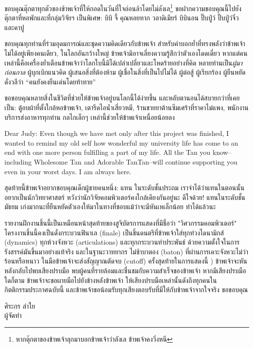 ขอบคุณตุ๊กตาทุกตัวของข้าพเจ้าที่ให้กอดในวันที่ใจอ่อนล้าโดยไม่ลังเล\footnote{หากตุ๊กตาของข้าพเจ้าลุกมาบอกข้าพเจ้าว่าลังเล ข้าพเจ้าคงวิ่งหนี} ขอฝากความขอบคุณนี้ไปยังตุ๊กตาที่หอพักและที่กลุ่มวิจัยฯ เป็นพิเศษ: บิบิ จี้ คุณหอยทาก วลาดิเมียร์ บิบินอน ปิ๊บปู่ว์ ปิ๊บปู่ว์จิ๋ว และคาปู

ขอบคุณทุกท่านที่ร่วมอุดมการณ์และชุดความคิดเดียวกับข้าพเจ้า สำหรับคำบอกย้ำที่ทรงพลังว่าข้าพเจ้าไม่ได้อยู่เพียงคนเดียว, ในโลกอันกว้างใหญ่ ข้าพเจ้ามิอาจเลี่ยงความรู้สึกว่าตัวเองโดดเดี่ยว หากแต่คนเหล่านี้คือเครื่องย้ำเตือนข้าพเจ้าว่าโลกใบนี้มิได้เปล่าเปลี่ยวและโหดร้ายอย่างที่คิด หลายท่านเป็น\textit{ผู้มาก่อนกาล} ผู้บุกเบิกแนวคิด ผู้เสนอสิ่งที่ต้องห้าม ผู้เชื่อในสิ่งที่เป็นไปไม่ได้ ผู้ต่อสู้ ผู้เรียกร้อง ผู้ยืนหยัด ดั่งวลีว่า ``คนยังคงยืนเด่นโดยท้าทาย''

ขอขอบคุณหลายสิ่งในชีวิตที่ช่วยให้ข้าพเจ้าอยู่บนโลกนี้ได้ง่ายขึ้น และหลับตานอนได้สบายกว่าที่เคยเป็น: ตู้อบผ้าที่ตั้งใกล้หอข้าพเจ้า, เตารีดไอน้ำเสี่ยวหมี, ร้านขายยาต้านซึมเศร้าที่ราคาไม่แพง, พนักงานบริการส่งอาหารทุกท่าน กลไกเล็กๆ เหล่านี้ช่วยให้ข้าพเจ้าเหนื่อยน้อยลง

Dear Judy: Even though we have met only after this project was finished, I wanted to remind my old self how wonderful my university life has come to an end with one more person fulfilling a part of my life. All the Tan you know--including Wholesome Tan and Adorable TanTan--will continue supporting you even in your worst days. I am always here.

สุดท้ายนี้ข้าพเจ้าอยากขอบคุณเด็กผู้ชายคนหนึ่ง: แทน ในระดับชั้นประถม  เราจำได้ว่าแทนในตอนนั้นอยากเป็นนักวิทยาศาสตร์ หวังว่านักวิจัยคอมพิวเตอร์คงใกล้เคียงกันอยู่นะ ดีใจด้วย! แทนในระดับชั้นมัธยม เก่งมากนะที่ยืนหยัดตัวเองให้มาในทางที่ชอบแม้ว่าจะมีหันเหเล็กน้อย ทำได้แล้วนะ

รายงานฝึกงานชิ้นนี้เป็นเหมือนหน้าสุดท้ายของสูจิบัตรการแสดงที่มีชื่อว่า "วิศวกรรมคอมพิวเตอร์" โครงงานชิ้นนี้คงเป็นดั่งกระบวนฟินาเล (finale) เป็นชิ้นดนตรีที่ข้าพเจ้าใส่ทุกท่วงไดนามิกส์ (dynamics) ทุกห้วงจังหวะ (articulations) และทุกกระบวนท่าประพันธ์ ด้วยความตั้งใจในการรังสรรค์มันขึ้นมาอย่างแท้จริง และในฐานะวาทยากร ไม่ช้าบาตอง (baton) ที่ผ่านการเคาะจังหวะไม่ว่าร้อนหรือหนาว ในมือข้าพเจ้าจะส่งสัญญาณตัดจบ (cutoff) ครั้งสุดท้ายในการแสดงนี้ ) ข้าพเจ้าจะหันหลังกลับไปพบเสียงปรบมือ พบผู้คนที่รายล้อมและชื่นชมกับความสำเร็จของข้าพเจ้า หากมีเสียงปรบมือใดก็ตาม ข้าพเจ้าจะขอผายมือไปยังข้างหลังข้าพเจ้า ให้เสียงปรบมือเหล่านั้นดังถึงทุกคนในกิตติกรรมประกาศฉบับนี้ และข้าพเจ้าขอน้อมรับทุกเสียงตอบรับที่มีให้กับข้าพเจ้าจากใจจริง ขอขอบคุณ

\vskip 20pt

\hfill\begin{minipage}
    {\dimexpr 5cm}
    \begin{center}
        ศิระกร ลำใย\\
        ผู้จัดทำ
    \end{center}
    \xdef\tpd{\the\prevdepth}
\end{minipage}